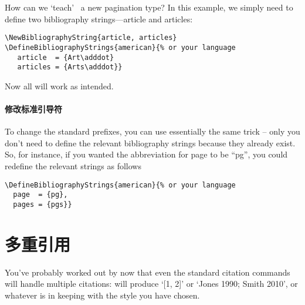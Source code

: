 How can we `teach' \biblatex\ a new pagination type? In this example,
we simply need to define two bibliography strings---article and
articles:

\begin{verbatim}
\NewBibliographyString{article, articles}
\DefineBibliographyStrings{american}{% or your language
   article  = {Art\adddot}
   articles = {Arts\adddot}}
\end{verbatim}
Now all will work as intended.

\paragraph{修改标准引导符} To change the standard
prefixes, you can use essentially the same trick -- only you don't
need to define the relevant bibliography strings because they already
exist. So, for instance, if you wanted the abbreviation for page to be
“pg”, you could redefine the relevant strings as follows

\begin{verbatim}
\DefineBibliographyStrings{american}{% or your language
  page  = {pg},
  pages = {pgs}}
\end{verbatim}

\section{多重引用}

You've probably worked out by now that even the standard citation
commands will handle multiple citations:  will
produce `[1, 2]' or `Jones 1990; Smith 2010', or whatever is in
keeping with the style you have chosen.


